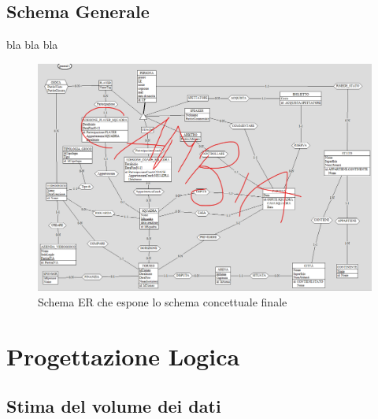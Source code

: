 \documentclass[a4paper,12pt]{report}
\begin{document}
\section{Schema Generale}
bla bla bla
\begin{figure}[!htb]
	\centerline{\includegraphics[scale=0.6]{img/ER_Generale.png}}
	\caption{Schema ER che espone lo schema concettuale finale}
	\label{img:ER_Generale}
\end{figure}

\chapter{Progettazione Logica}
\section{Stima del volume dei dati}
\renewcommand{\arraystretch}{1.5} %
\setlength{\arrayrulewidth}{0.5mm}%
\setlength{\tabcolsep}{10pt}%
\setlength\doublerulesep{0.15cm}%
\end{document}
